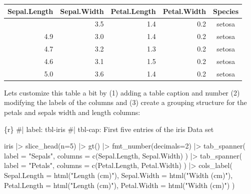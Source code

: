 \documentclass[
  letterpaper,
  DIV=11,
  numbers=noendperiod]{scrartcl}
\newenvironment{Shaded}{\begin{snugshade}}{\end{snugshade}}
\newcommand{\AttributeTok}[1]{\textcolor[rgb]{0.40,0.45,0.13}{#1}}
\newcommand{\CommentTok}[1]{\textcolor[rgb]{0.37,0.37,0.37}{#1}}
\newcommand{\DecValTok}[1]{\textcolor[rgb]{0.68,0.00,0.00}{#1}}
\newcommand{\FunctionTok}[1]{\textcolor[rgb]{0.28,0.35,0.67}{#1}}
\newcommand{\InformationTok}[1]{\textcolor[rgb]{0.37,0.37,0.37}{#1}}
\newcommand{\NormalTok}[1]{\textcolor[rgb]{0.00,0.23,0.31}{#1}}
\newcommand{\SpecialCharTok}[1]{\textcolor[rgb]{0.37,0.37,0.37}{#1}}
\newcommand{\StringTok}[1]{\textcolor[rgb]{0.13,0.47,0.30}{#1}}
\begin{document}
\begin{longtable*}{rrrrc}
\toprule
Sepal.Length & Sepal.Width & Petal.Length & Petal.Width & Species \\ 
\midrule{} & 3.5 & 1.4 & 0.2 & setosa \\ 
4.9 & 3.0 & 1.4 & 0.2 & setosa \\ 
4.7 & 3.2 & 1.3 & 0.2 & setosa \\ 
4.6 & 3.1 & 1.5 & 0.2 & setosa \\ 
5.0 & 3.6 & 1.4 & 0.2 & setosa \\ 
\bottomrule
\end{longtable*}

Lets customize this table a bit by (1) adding a table caption and number
(2) modifying the labels of the columns and (3) create a grouping
structure for the petals and sepals width and length columns:

\begin{Shaded}
\begin{Highlighting}[]
\InformationTok{\textasciigrave{}\textasciigrave{}\textasciigrave{}\{r\}}
\CommentTok{\#| label: tbl{-}iris}
\CommentTok{\#| tbl{-}cap: First five entries of the iris Data set}

\NormalTok{iris }\SpecialCharTok{|\textgreater{}} 
  \FunctionTok{slice\_head}\NormalTok{(}\AttributeTok{n=}\DecValTok{5}\NormalTok{) }\SpecialCharTok{|\textgreater{}}
  \FunctionTok{gt}\NormalTok{() }\SpecialCharTok{|\textgreater{}}
   \FunctionTok{fmt\_number}\NormalTok{(}\AttributeTok{decimals=}\DecValTok{2}\NormalTok{) }\SpecialCharTok{|\textgreater{}}
 \FunctionTok{tab\_spanner}\NormalTok{(}
    \AttributeTok{label =} \StringTok{"Sepals"}\NormalTok{,}
    \AttributeTok{columns =} \FunctionTok{c}\NormalTok{(Sepal.Length, Sepal.Width)}
\NormalTok{  ) }\SpecialCharTok{|\textgreater{}}
  \FunctionTok{tab\_spanner}\NormalTok{(}
    \AttributeTok{label =} \StringTok{"Petals"}\NormalTok{,}
    \AttributeTok{columns =} \FunctionTok{c}\NormalTok{(Petal.Length, Petal.Width)}
\NormalTok{  ) }\SpecialCharTok{|\textgreater{}}
  \FunctionTok{cols\_label}\NormalTok{(}
    \AttributeTok{Sepal.Length =} \FunctionTok{html}\NormalTok{(}\StringTok{"Length (cm)"}\NormalTok{),}
    \AttributeTok{Sepal.Width =} \FunctionTok{html}\NormalTok{(}\StringTok{"Width (cm)"}\NormalTok{),}
    \AttributeTok{Petal.Length =} \FunctionTok{html}\NormalTok{(}\StringTok{"Length (cm)"}\NormalTok{),}
    \AttributeTok{Petal.Width =} \FunctionTok{html}\NormalTok{(}\StringTok{"Width (cm)"}\NormalTok{)}
\NormalTok{  )}
\InformationTok{\textasciigrave{}\textasciigrave{}\textasciigrave{}}
\end{Highlighting}
\end{Shaded}
\end{document}
